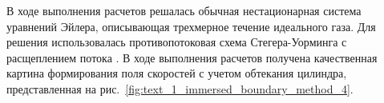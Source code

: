 В ходе выполнения расчетов решалась обычная нестационарная система уравнений Эйлера, описывающая трехмерное течение идеального газа.
Для решения использовалась противопотоковая схема Стегера-Уорминга с расщеплением потока \cite{Smirnova2018Euler}.
В ходе выполнения расчетов получена качественная картина формирования поля скоростей с учетом обтекания цилиндра, представленная на рис.~\ref{fig:text_1_immersed_boundary_method_4}.
